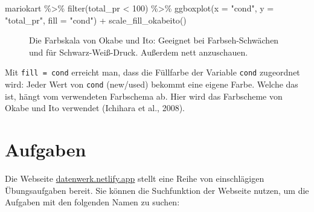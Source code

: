 \documentclass[
  letterpaper,
  twoside,
  open=any]{scrbook}
\newenvironment{Shaded}{\begin{snugshade}}{\end{snugshade}}
\newcommand{\AttributeTok}[1]{\textcolor[rgb]{0.40,0.45,0.13}{#1}}
\newcommand{\DecValTok}[1]{\textcolor[rgb]{0.68,0.00,0.00}{#1}}
\newcommand{\FunctionTok}[1]{\textcolor[rgb]{0.28,0.35,0.67}{#1}}
\newcommand{\NormalTok}[1]{\textcolor[rgb]{0.00,0.23,0.31}{#1}}
\newcommand{\SpecialCharTok}[1]{\textcolor[rgb]{0.37,0.37,0.37}{#1}}
\newcommand{\StringTok}[1]{\textcolor[rgb]{0.13,0.47,0.30}{#1}}
\theoremstyle{definition}
\theoremstyle{definition}
\theoremstyle{definition}
\theoremstyle{remark}
\begin{document}
\begin{Shaded}
\begin{Highlighting}[]
\NormalTok{mariokart }\SpecialCharTok{\%\textgreater{}\%} 
  \FunctionTok{filter}\NormalTok{(total\_pr }\SpecialCharTok{\textless{}} \DecValTok{100}\NormalTok{) }\SpecialCharTok{\%\textgreater{}\%} 
  \FunctionTok{ggboxplot}\NormalTok{(}\AttributeTok{x =} \StringTok{"cond"}\NormalTok{, }\AttributeTok{y =} \StringTok{"total\_pr"}\NormalTok{, }\AttributeTok{fill =} \StringTok{"cond"}\NormalTok{) }\SpecialCharTok{+}
  \FunctionTok{scale\_fill\_okabeito}\NormalTok{()}
\end{Highlighting}
\end{Shaded}

\begin{figure}[H]


\caption{\label{fig-okabe}Die Farbskala von Okabe und Ito: Geeignet bei
Farbseh-Schwächen und für Schwarz-Weiß-Druck. Außerdem nett
anzuschauen.}

\end{figure}%

Mit \texttt{fill\ =\ cond} erreicht man, dass die Füllfarbe der Variable
\texttt{cond} zugeordnet wird: Jeder Wert von \texttt{cond} (new/used)
bekommt eine eigene Farbe. Welche das ist, hängt vom verwendeten
Farbschema ab. Hier wird das Farbscheme von Okabe und Ito verwendet
(Ichihara et al., 2008).

\section{Aufgaben}\label{aufgaben-3}

Die Webseite \href{https://datenwerk.netlify.app}{datenwerk.netlify.app}
stellt eine Reihe von einschlägigen Übungsaufgaben bereit. Sie können
die Suchfunktion der Webseite nutzen, um die Aufgaben mit den folgenden
Namen zu suchen:
\end{document}
